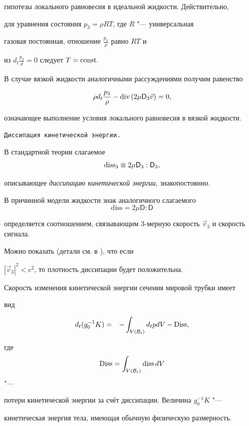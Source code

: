 гипотезы локального равновесия в идеальной жидкости. Действительно,

для уравнения состояния $p_{3}=\rho RT$, где $R$ "---  универсальная

газовая постоянная, отношение $\frac{p_{3}}{\rho}$ равно $RT$ и

из $d_{t}\frac{p_{3}}{\rho}=0$ следует $T=\textnormal{const}.$



В случае вязкой жидкости аналогичными рассуждениями получим равенство

$$\rho d_{t}\frac{p_{3}}{\rho}-\textnormal{div}\left(2\mu\mathsf{D}_{3}\vec{v}\right)=0,$$

означающее выполнение условия локального равновесия в вязкой жидкости.



\smallskip



{\tt Диссипация кинетической энергии.}

В стандартной теории слагаемое $$\textnormal{diss}_{3}\equiv2\mu\mathsf{D}_{3}:\mathsf{D}_{3},$$

описывающее \emph{диссипацию кинетической энергии}, знакопостоянно.

В причинной модели жидкости знак аналогичного слагаемого $$\textrm{diss}=2\mu\mathsf{D}:\mathsf{D}$$

определяется соотношением, связывающим 3-мерную скорость $\vec{v}_{3}$ и скорость сигнала. 

Можно показать (детали см. в \cite{Belevich05}), что если

$|\vec{v}_{3}|^{2}<c^{2}$, то плотность диссипации будет положительна.



Скорость изменения кинетической энергии сечения мировой трубки имеет

вид 

\begin{eqnarray}

d_{t}(g_{0}^{-1}K) & = & -\int_{V(\mathcal{B}_{t})}d_{t}pdV-\textnormal{Diss},\label{eq:dissK}

\end{eqnarray}

где $$\textnormal{Diss}=\int_{V(\mathcal{B}_{t})}\textnormal{diss}\, dV$$ "--- 

потери кинетической энергии за счёт диссипации. Величина $g_{0}^{-1}K$ "--- 

кинетическая энергия тела, имеющая обычную физическую размерность.

